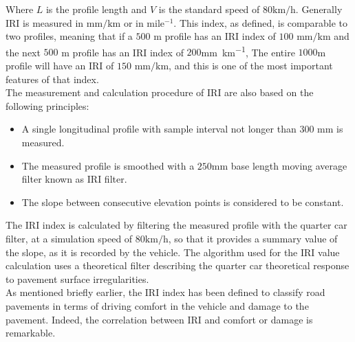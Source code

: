 \documentclass[tesi]{subfiles}
\begin{document}
\noindent Where $L$ is the profile length and $V$ is the standard speed of $\num{80} \si{\km\per\hour}$. Generally IRI is measured in $\si{\milli\meter\per\km}$ or in  mile$^{-1}$. This index, as defined, is comparable to two profiles, meaning that if a $500$ $\si{\meter}$ profile has an IRI index of $100$ $\si{\milli\meter\per\km}$ and the next $500$ \thinspace \si{\meter} profile has an IRI index of $200$\thinspace\si{\milli\meter\per\km}, The entire $1000$\si{\meter} profile will have an IRI of $150$ $\si{\milli\meter\per\km}$, and this is one of the most important features\cite{little_book} of that index. \\

\noindent The measurement and calculation procedure of IRI are also based on the following principles:
\begin{itemize}

\item A single longitudinal profile with sample interval not longer than $300$ $\si{\milli\meter}$ is measured.
\item The measured profile is smoothed with a $250$\si{\milli\meter} base length moving average filter known as IRI filter.
\item The slope between consecutive elevation points is considered to be constant.

\end{itemize}
\noindent The IRI index is calculated by filtering the measured profile with the quarter car filter, at a simulation speed of $\num{80} \si{\km\per\hour}$, so that it provides a summary value of the slope, as it is recorded by the vehicle. The algorithm used for the IRI value calculation uses a theoretical filter describing the quarter car theoretical response to pavement surface irregularities.
\\
\noindent As mentioned briefly earlier, the IRI index has been defined to classify road pavements in terms of driving comfort in the vehicle and damage to the pavement. Indeed, the correlation between IRI and comfort or damage is remarkable\cite{gillespie1992everything}.\\
\end{document}
